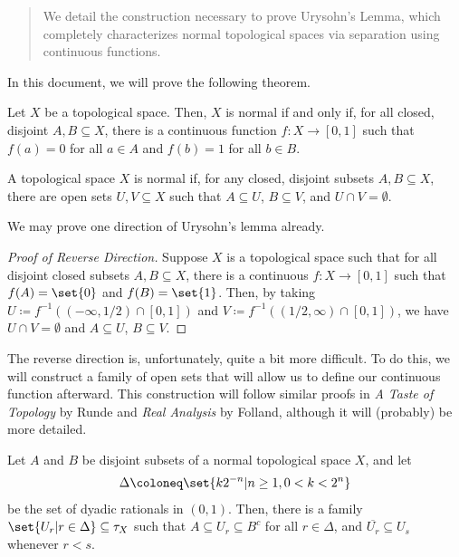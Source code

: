 \documentclass[10pt]{mypackage}
\begin{document}
\RaggedRight
\begin{abstract}
  \noindent We detail the construction necessary to prove Urysohn's Lemma, which completely characterizes normal topological spaces via separation using continuous functions.
\end{abstract}
In this document, we will prove the following theorem.
\begin{theorem}
  Let $X$ be a topological space. Then, $X$ is normal if and only if, for all closed, disjoint $A,B\subseteq X$, there is a continuous function $f\colon X\rightarrow [0,1]$ such that $f(a) = 0$ for all $a\in A$ and $f(b) = 1$ for all $b\in B$.
\end{theorem}
\begin{definition}
  A topological space $X$ is normal if, for any closed, disjoint subsets $A,B\subseteq X$, there are open sets $U,V\subseteq X$ such that $A\subseteq U$, $B\subseteq V$, and $U\cap V = \emptyset$.
\end{definition}
We may prove one direction of Urysohn's lemma already.
\begin{proof}[Proof of Reverse Direction]
  Suppose $X$ is a topological space such that for all disjoint closed subsets $A,B\subseteq X$, there is a continuous $f\colon X\rightarrow [0,1]$ such that $f(A) = \set{0}$ and $f(B) = \set{1}$. Then, by taking $U \coloneq f^{-1}\left( \left( -\infty,1/2 \right)\cap [0,1] \right)$ and $V \coloneq f^{-1}\left( (1/2,\infty)\cap [0,1] \right)$, we have $U\cap V = \emptyset$ and $A\subseteq U$, $B\subseteq V$.
\end{proof}
The reverse direction is, unfortunately, quite a bit more difficult. To do this, we will construct a family of open sets that will allow us to define our continuous function afterward. This construction will follow similar proofs in \textit{A Taste of Topology} by Runde and \textit{Real Analysis} by Folland, although it will (probably) be more detailed.
\begin{lemma}
  Let $A$ and $B$ be disjoint subsets of a normal topological space $X$, and let 
  \begin{align*}
    \Delta \coloneq \set{k2^{-n} | n\geq 1,0 < k < 2^{n}}
  \end{align*}
  be the set of dyadic rationals in $(0,1)$. Then, there is a family $\set{U_r | r\in\Delta}\subseteq \tau_{X}$  such that $A\subseteq U_{r}\subseteq B^{c}$ for all $r\in\Delta$, and $\overline{U_r}\subseteq U_s$ whenever $r < s$.
\end{lemma}
\end{document}
